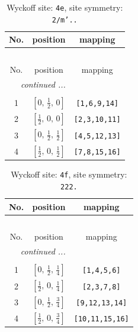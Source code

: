 \documentclass[fleqn,8pt]{jsarticle}
\begin{document}
\begin{longtable}{ccc}
\caption{Wyckoff site: {\tt 4e}, site symmetry: {\tt 2/m'..}}
 \\
 \hline \hline
No. & position & mapping \\ \hline \endfirsthead

\multicolumn{2}{l}{\tablename\ \thetable{}} \\
 \hline \hline
No. & position & mapping \\ \hline \endhead

 \hline \hline
\multicolumn{2}{r}{\footnotesize\it continued ...} \\ \endfoot

 \hline \hline
\multicolumn{2}{r}{} \\ \endlastfoot

1 & $\left[ 0,\, \frac{1}{2},\, 0 \right]$ & {\tt [1,6,9,14]} \\ \hline
2 & $\left[ \frac{1}{2},\, 0,\, 0 \right]$ & {\tt [2,3,10,11]} \\ \hline
3 & $\left[ 0,\, \frac{1}{2},\, \frac{1}{2} \right]$ & {\tt [4,5,12,13]} \\ \hline
4 & $\left[ \frac{1}{2},\, 0,\, \frac{1}{2} \right]$ & {\tt [7,8,15,16]} \\
\end{longtable}
\renewcommand{\arraystretch}{1.2}
\begin{longtable}{ccc}
\caption{Wyckoff site: {\tt 4f}, site symmetry: {\tt 222.}}
 \\
 \hline \hline
No. & position & mapping \\ \hline \endfirsthead

\multicolumn{2}{l}{\tablename\ \thetable{}} \\
 \hline \hline
No. & position & mapping \\ \hline \endhead

 \hline \hline
\multicolumn{2}{r}{\footnotesize\it continued ...} \\ \endfoot

 \hline \hline
\multicolumn{2}{r}{} \\ \endlastfoot

1 & $\left[ 0,\, \frac{1}{2},\, \frac{1}{4} \right]$ & {\tt [1,4,5,6]} \\ \hline
2 & $\left[ \frac{1}{2},\, 0,\, \frac{1}{4} \right]$ & {\tt [2,3,7,8]} \\ \hline
3 & $\left[ 0,\, \frac{1}{2},\, \frac{3}{4} \right]$ & {\tt [9,12,13,14]} \\ \hline
4 & $\left[ \frac{1}{2},\, 0,\, \frac{3}{4} \right]$ & {\tt [10,11,15,16]} \\
\end{longtable}
\end{document}
